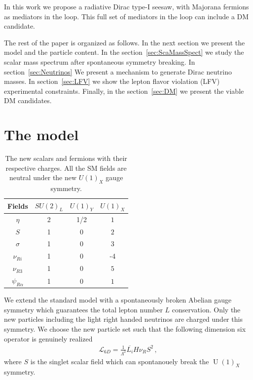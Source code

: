 \documentclass[12pt]{article}
\begin{document}
In this work we propose a radiative Dirac type-I seesaw, with Majorana
fermions as mediators in the loop. This full set of mediators in the
loop can include a DM candidate.

The rest of the paper is organized as follows. In the next section we present the model and the particle content. In the section~\ref{sec:ScaMassSpect} we study the scalar mass spectrum after spontaneous symmetry breaking. In section~\ref{sec:Neutrinos} We present a mechanism to generate Dirac neutrino masses. In section~\ref{sec:LFV} we show the lepton flavor violation (LFV) experimental  constraints. Finally, in the section~\ref{sec:DM} we present the viable DM candidates.

\section{The model}
\label{sec:Model}
%
\begin{table}[t!]
  \centering
  \begin{tabular}{|c|c|c|c|}
    \hline  
    Fields     & $SU(2)_L$ & $U(1)_Y $ & $U(1)_X$ \\ \hline
    $\eta$  & 2 & 1/2  & $1$ \\
    $S$ & 1 & 0  & $2$ \\
    $\sigma$ & 1 & 0 & $3$ \\
    \hline
    $\nu_{Ri}$ & 1 & 0 & -4\\
    $\nu_{R3}$ & 1 & 0 & $5$\\
    $\psi_{R\alpha}$  & 1 & 0 & $1$ \\\hline
  \end{tabular}
  \caption{The new scalars and fermions with their respective charges. All the SM fields are neutral under the new $U(1)_X$ gauge symmetry. }
    \label{tab:partcont}
\end{table}
%
We extend the standard model with a spontaneously broken Abelian gauge symmetry  which guarantees the total lepton number $L$ conservation. Only the new particles including the light right handed neutrinos are charged under this symmetry. We choose the new particle set such that the following dimension six operator is genuinely realized
\begin{align}
  \label{eq:ld6}
  \mathcal{L}_{6D}=\frac{1}{\Lambda^2} \overline{L_i} H \nu_R S^2\,,
\end{align}
where $S$ is the singlet scalar field which can spontanouely break the $\operatorname{U}(1)_X$ symmetry.
\end{document}
